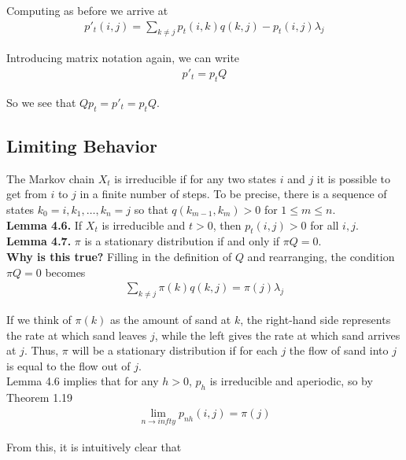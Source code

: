 \documentclass[12pt]{article}
\begin{document}
Computing as before we arrive at
\begin{align*}
p'_t(i, j) = \sum_{k \neq j} p_t(i, k)q(k, j) - p_t(i, j)\lambda_j
\end{align*}

Introducing matrix notation again, we can write
\begin{align*}
p'_t = p_tQ
\end{align*}

So we see that $Qp_t = p'_t = p_tQ$.


\subsection{Limiting Behavior}

The Markov chain $X_t$ is irreducible if for any two states $i$ and $j$ it is possible to get from $i$ to $j$ in a finite number of steps. To be precise, there is a sequence of states $k_0 = i, k_1, \ldots, k_n = j$ so that $q(k_{m-1}, k_m) > 0$ for $1 \leq m \leq n$.\\

\textbf{Lemma 4.6.} If $X_t$ is irreducible and $t > 0$, then $p_t(i, j) > 0$ for all $i, j$.\\

\textbf{Lemma 4.7.} $\pi$ is a stationary distribution if and only if $\pi Q = 0$.\\

\textbf{Why is this true?} Filling in the definition of $Q$ and rearranging, the condition $\pi Q = 0$ becomes
\begin{align*}
\sum_{k \neq j} \pi(k) q(k, j) = \pi(j) \lambda_j
\end{align*}

If we think of $\pi(k)$ as the amount of sand at $k$, the right-hand side represents the rate at which sand leaves $j$, while the left gives the rate at which sand arrives at $j$. Thus, $\pi$ will be a stationary distribution if for each $j$ the flow of sand into $j$ is equal to the flow out of $j$.\\

Lemma 4.6 implies that for any $h > 0$, $p_h$ is irreducible and aperiodic, so by Theorem 1.19
\begin{align*}
\lim_{n \to infty} p_{nh}(i, j) = \pi(j)
\end{align*}

From this, it is intuitively clear that\\
\end{document}
